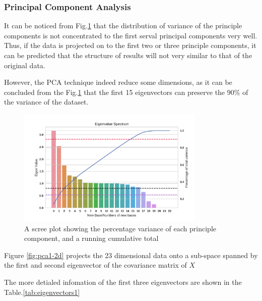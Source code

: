 \documentclass[12pt]{article}
\begin{document}
\subsubsection{Principal Component Analysis}
It can be noticed from Fig.\ref{fig:eigenvalues1} that the distribution of variance of the principle components is not concentrated to the first serval principal components very well. Thus, if the data is projected on to the first two or three principle components, it can be predicted that the structure of results will not very similar to that of the original data.\par
However, the PCA technique indeed reduce some dimensions, as it can be concluded from the Fig.\ref{fig:eigenvalues1} that the first 15 eigenvectors can preserve the 90\% of the variance of the dataset. 
\begin{figure}[htb]
\centering
\includegraphics[width = 0.8\textwidth]{images/eigenvalues1.png}
\caption{ A scree plot showing the percentage variance of each principle component, and a running cumulative total}
\label{fig:eigenvalues1}
\end{figure}
\par Figure \ref{fig:pca1-2d} projects the 23 dimensional data onto a sub-space spanned by the first and second eigenvector of the covariance matrix of $X$
\par The more detialed infomation of the first three eigenvectors are shown in the Table.\ref{tab:eigenvectors1}
\end{document}

